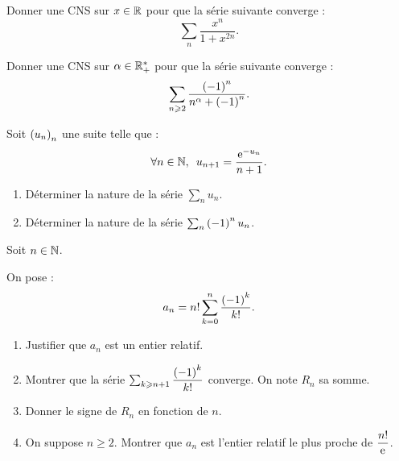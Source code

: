 \begin{corr}
\end{corr}

\begin{exo}[Exercice 10]
Donner une CNS sur \(x\in\mathbb{R}\) pour que la série suivante converge : \[\sum_n\dfrac{x^n}{1+x^{2n}}.\]
\end{exo}

\begin{corr}
\end{corr}

\begin{exo}[Exercice 11]
Donner une CNS sur \(\alpha\in\mathbb{R}_+^*\) pour que la série suivante converge : \[\sum_{n\geqslant2}\dfrac{\left(-1\right)^n}{n^{\alpha}+\left(-1\right)^n}.\]
\end{exo}

\begin{corr}
\end{corr}

\begin{exo}[Exercice 12]
Soit \(\left(u_n\right)_n\) une suite telle que : \[\quantifs{\forall n\in\N}u_{n+1}=\dfrac{\e{-u_n}}{n+1}.\]

\begin{enumerate}
\item Déterminer la nature de la série \(\sum_nu_n\). \\

\item Déterminer la nature de la série \(\sum_n\left(-1\right)^nu_n\).
\end{enumerate}
\end{exo}

\begin{corr}
\end{corr}

\begin{exo}[Exercice 13]
Soit \(n\in\mathbb{N}\).

On pose : \[a_n=n!\sum_{k=0}^n\dfrac{\left(-1\right)^k}{k!}.\]

\begin{enumerate}
\item Justifier que \(a_n\) est un entier relatif. \\

\item Montrer que la série \(\sum_{k\geqslant n+1}\dfrac{\left(-1\right)^k}{k!}\) converge. On note \(R_n\) sa somme. \\

\item Donner le signe de \(R_n\) en fonction de \(n\). \\

\item On suppose \(n\geq2\). Montrer que \(a_n\) est l'entier relatif le plus proche de \(\dfrac{n!}{\mathrm{e}^{}}\).
\end{enumerate}
\end{exo}

